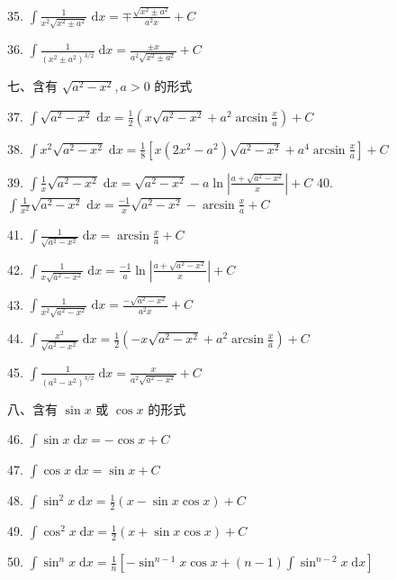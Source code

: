 35. \(\int \frac{1}{{x}^{2}\sqrt{{x}^{2} \pm  {a}^{2}}}\mathrm{\;d}x =  \mp  \frac{\sqrt{{x}^{2} \pm  {a}^{2}}}{{a}^{2}x} + C\)

36. \(\int \frac{1}{{\left( {x}^{2} \pm  {a}^{2}\right) }^{3/2}}\mathrm{\;d}x = \frac{\pm x}{{a}^{2}\sqrt{{x}^{2} \pm  {a}^{2}}} + C\)

七、含有 \(\sqrt{{a}^{2} - {x}^{2}},a > 0\) 的形式

37. \(\int \sqrt{{a}^{2} - {x}^{2}}\mathrm{\;d}x = \frac{1}{2}\left( {x\sqrt{{a}^{2} - {x}^{2}} + {a}^{2}\arcsin \frac{x}{a}}\right)  + C\)

38. \(\int {x}^{2}\sqrt{{a}^{2} - {x}^{2}}\mathrm{\;d}x = \frac{1}{8}\left\lbrack  {x\left( {2{x}^{2} - {a}^{2}}\right) \sqrt{{a}^{2} - {x}^{2}} + {a}^{4}\arcsin \frac{x}{a}}\right\rbrack   + C\)

39. \(\int \frac{1}{x}\sqrt{{a}^{2} - {x}^{2}}\mathrm{\;d}x = \sqrt{{a}^{2} - {x}^{2}} - a\ln \left| \frac{a + \sqrt{{a}^{2} - {x}^{2}}}{x}\right|  + C\) 40. \(\int \frac{1}{{x}^{2}}\sqrt{{a}^{2} - {x}^{2}}\mathrm{\;d}x = \frac{-1}{x}\sqrt{{a}^{2} - {x}^{2}} - \arcsin \frac{x}{a} + C\)

41. \(\int \frac{1}{\sqrt{{a}^{2} - {x}^{2}}}\mathrm{\;d}x = \arcsin \frac{x}{a} + C\)

42. \(\int \frac{1}{x\sqrt{{a}^{2} - {x}^{2}}}\mathrm{\;d}x = \frac{-1}{a}\ln \left| \frac{a + \sqrt{{a}^{2} - {x}^{2}}}{x}\right|  + C\)

43. \(\int \frac{1}{{x}^{2}\sqrt{{a}^{2} - {x}^{2}}}\mathrm{\;d}x = \frac{-\sqrt{{a}^{2} - {x}^{2}}}{{a}^{2}x} + C\)

44. \(\int \frac{{x}^{2}}{\sqrt{{a}^{2} - {x}^{2}}}\mathrm{\;d}x = \frac{1}{2}\left( {-x\sqrt{{a}^{2} - {x}^{2}} + {a}^{2}\arcsin \frac{x}{a}}\right)  + C\)

45. \(\int \frac{1}{{\left( {a}^{2} - {x}^{2}\right) }^{3/2}}\mathrm{\;d}x = \frac{x}{{a}^{2}\sqrt{{a}^{2} - {x}^{2}}} + C\)

八、含有 \(\sin x\) 或 \(\cos x\) 的形式

46. \(\int \sin x\mathrm{\;d}x =  - \cos x + C\)

47. \(\int \cos x\mathrm{\;d}x = \sin x + C\)

48. \(\int {\sin }^{2}x\mathrm{\;d}x = \frac{1}{2}\left( {x - \sin x\cos x}\right)  + C\)

49. \(\int {\cos }^{2}x\mathrm{\;d}x = \frac{1}{2}\left( {x + \sin x\cos x}\right)  + C\)

50. \(\int {\sin }^{n}x\mathrm{\;d}x = \frac{1}{n}\left\lbrack  {-{\sin }^{n - 1}x\cos x + \left( {n - 1}\right) \int {\sin }^{n - 2}x\mathrm{\;d}x}\right\rbrack\)

